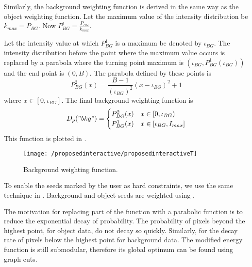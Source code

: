 \begin{definition} 
	Similarly, the background weighting function is derived in the same way as the object weighting function. Let the maximum value of the intensity distribution be $k_{max} = P_{BG}$. Now $P_{BG}^{1} = \frac{P_{BG}}{k_{max}}$.
	
	Let the intensity value at which $P_{BG}^{1}$ is a maximum be denoted by $\iota_{BG}$. The intensity distribution before the point where the maximum value occurs is replaced by a parabola where the turning point maximum is $\left(\iota_{BG}, P_{BG}^{1}(\iota_{BG})\right)$ and the end point is $(0,B)$. The parabola defined by these points is 
	\begin{equation}
	P_{BG}^2(x) = \frac{B-1}{(\iota_{BG})^2}(x-\iota_{BG})^2 +1 
	\end{equation}
	where $x \in [0,\iota_{BG}]$.
	The final background weighting function is
	\begin{equation}
	D_p("bkg") = \begin{cases} 
	P_{BG}^2(x) & x \in [0,\iota_{BG}) \\
	P_{BG}^1(x) & x \in [\iota_{BG},I_{max}]
	\end{cases}
	\end{equation}
	This function is plotted in .
	
	\begin{figure}[!h]
		\centering
		\texttt{[image: /proposedinteractive/proposedinteractiveT]}
		\caption{Background weighting function.}
		\label{fig:proposedinteractiveT}
	\end{figure}
\end{definition}

\begin{definition}
	To enable the seeds marked by the user as hard constraints, we use the same technique in \citep{Boykov2001_2}. Background and object seeds are weighted using .
\end{definition}

The motivation for replacing part of the function with a parabolic function is to reduce the exponential decay of probability. The probability of pixels beyond the highest point, for object data, do not decay so quickly. Similarly, for the decay rate of pixels below the highest point for background data. The modified energy function is still submodular, therefore its global optimum can be found using graph cuts.


